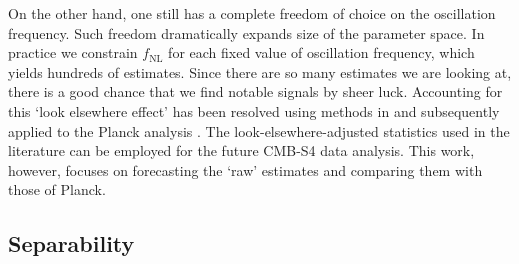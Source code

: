 On the other hand, one still has a complete freedom of choice on the oscillation frequency. Such freedom dramatically expands size of the parameter space. In practice we constrain $f_\text{NL}$ for each fixed value of oscillation frequency, which yields hundreds of estimates. Since there are so many estimates we are looking at, there is a good chance that we find notable signals by sheer luck. Accounting for this `look elsewhere effect' has been resolved using methods in \cite{Fergusson2015a} and subsequently applied to the Planck analysis \cite{PlanckCollaboration2015,Fergusson2015b}. The look-elsewhere-adjusted statistics used in the literature can be employed for the future CMB-S4 data analysis. This work, however, focuses on forecasting the `raw' estimates and comparing them with those of Planck.


\subsection{Separability}

